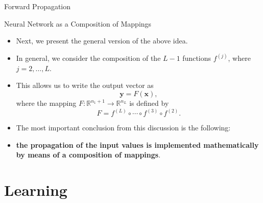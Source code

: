 \documentclass[8pt,american]{beamer}
\begin{document}
\begin{frame}{Forward Propagation}

\begin{block}{Neural Network as a Composition of Mappings}
\begin{itemize}
\justifying
\item Next, we present the general version of the above idea.
\item In general, we consider the composition of the $L-1$ functions
  $f^{\left(j\right)}$, where $j=2,\ldots,L$.
\item This allows us to write the output vector as
  \begin{equation}
  \mathbf{y}=F\left(\mathbf{x}\right),
  \end{equation}
  where the mapping $F:\mathbb{R}^{n_{1}+1}\rightarrow\mathbb{R}^{n_{L}}$ is
  defined by
  \begin{equation}
  F=f^{\left(L\right)}\circ\cdots\circ f^{\left(3\right)}\circ f^{\left(2\right)}.
  \end{equation}
\item The most important conclusion from this discussion is the following:
\item \textbf{the propagation of the input values is implemented mathematically
  by means of a composition of mappings}.
\end{itemize}
\end{block}

\end{frame}

\section[]{Learning}
\end{document}
